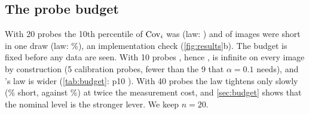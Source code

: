 \subsection{The probe budget}
\label{sec:res:budget}
With 20 probes the 10th percentile of $\mathrm{Cov}_i$ was \NumMeasPTenTwenty{} (law: \NumBetaPTenTwenty) and \NumESeventeenShort{} of images were short in one draw (law: \NumBetaShortOneTwenty\%), an implementation check (\cref{fig:results}b).
The budget is fixed before any data are seen.
With 10 probes \mLocalSplit, hence \mDistBoth, is infinite on every image by construction (5 calibration probes, fewer than the 9 that $\alpha=0.1$ needs), and \mDual's law is wider (\cref{tab:budget}: p10 \NumBetaPTenTen).
With 40 probes the law tightens only slowly (\NumBetaShortOneForty\% short, against \NumBetaShortOneTwenty\%) at twice the measurement cost, and \cref{sec:budget} shows that the nominal level is the stronger lever. We keep $n=20$.

